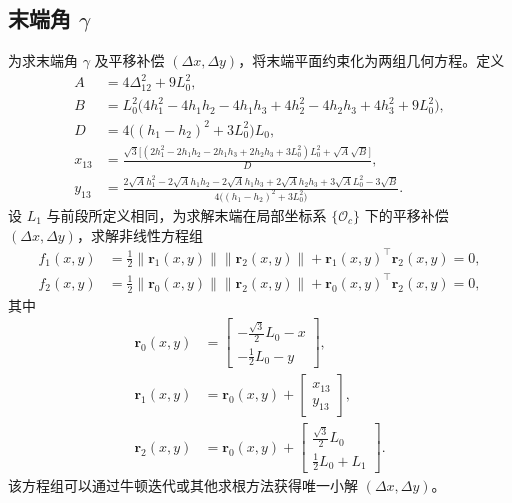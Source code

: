 \documentclass[12pt,a4paper]{article}
\begin{document}
\subsection{末端角 $\gamma$}
为求末端角 $\gamma$ 及平移补偿 $(\Delta x, \Delta y)$，将末端平面约束化为两组几何方程。定义
\begin{align}
  A &= 4\Delta_{12}^2 + 9L_0^2,\\
  B &= L_0^2 \Big(4 h_1^2 - 4 h_1 h_2 - 4 h_1 h_3 + 4 h_2^2 - 4 h_2 h_3 + 4 h_3^2 + 9 L_0^2 \Big),\\
  D &= 4\big((h_1 - h_2)^2 + 3 L_0^2\big)L_0,\\
  x_{13} &= \frac{\sqrt{3}\big[(2 h_1^2 - 2 h_1 h_2 - 2 h_1 h_3 + 2 h_2 h_3 + 3 L_0^2) L_0^2 + \sqrt{A}\sqrt{B}\big]}{D},\\
  y_{13} &= \frac{2 \sqrt{A} h_1^2 - 2 \sqrt{A} h_1 h_2 - 2 \sqrt{A} h_1 h_3 + 2 \sqrt{A} h_2 h_3 + 3 \sqrt{A} L_0^2 - 3 \sqrt{B}}{4\big((h_1 - h_2)^2 + 3 L_0^2\big)}.
\end{align}
设 $L_1$ 与前段所定义相同，为求解末端在局部坐标系 $\{\mathcal{O}_c\}$ 下的平移补偿 $(\Delta x, \Delta y)$，求解非线性方程组
\begin{align}
  f_1(x, y) &= \frac{1}{2}\lVert \bm r_1(x, y) \rVert\lVert \bm r_2(x, y) \rVert + \bm r_1(x, y)^\top \bm r_2(x, y) = 0,\\
  f_2(x, y) &= \frac{1}{2}\lVert \bm r_0(x, y) \rVert\lVert \bm r_2(x, y) \rVert + \bm r_0(x, y)^\top \bm r_2(x, y) = 0,
\end{align}
其中
\begin{align}
  \bm r_0(x, y) &= \begin{bmatrix}-\frac{\sqrt{3}}{2}L_0 - x \\ -\frac{1}{2}L_0 - y \end{bmatrix},\\
  \bm r_1(x, y) &= \bm r_0(x, y) + \begin{bmatrix}x_{13}\\ y_{13}\end{bmatrix},\\
  \bm r_2(x, y) &= \bm r_0(x, y) + \begin{bmatrix}\frac{\sqrt{3}}{2}L_0\\ \frac{1}{2}L_0 + L_1\end{bmatrix}.
\end{align}
该方程组可以通过牛顿迭代或其他求根方法获得唯一小解 $(\Delta x, \Delta y)$。
\end{document}
